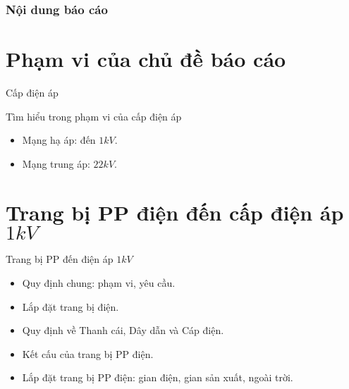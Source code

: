 \documentclass[20pt]{beamer}
\begin{document}
\begin{frame}	%
	\frametitle{Nội dung báo cáo}
	\tableofcontents
\end{frame}

\section*{Phạm vi của chủ đề báo cáo}

\begin{frame}{Cấp điện áp}
	\begin{block}{Tìm hiểu trong phạm vi của cấp điện áp}
		\begin{itemize}
			\item \alert{Mạng hạ áp:} đến $1kV$.
			
			\item \alert{Mạng trung áp:} $22kV$.
		\end{itemize}
	\end{block}
\end{frame}

\section{Trang bị PP điện đến cấp điện áp $1kV$}
\begin{frame}{Trang bị PP đến điện áp $1kV$}
	\begin{itemize}
	\justifying
		\item Quy định chung: phạm vi, yêu cầu.
		
		\item Lắp đặt trang bị điện.
		
		\item Quy định về Thanh cái, Dây dẫn và Cáp điện.
		
		\item Kết cấu của trang bị PP điện.
		
		\item Lắp đặt trang bị PP điện: gian điện, gian sản xuất, ngoài trời.
	\end{itemize}
\end{frame}
\end{document}
